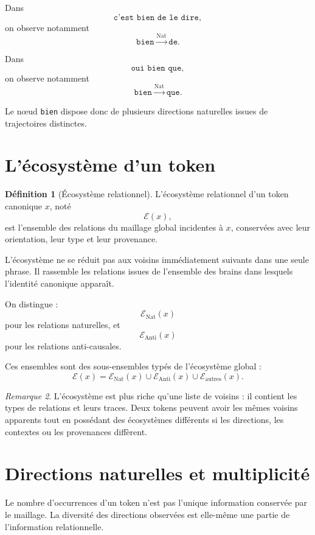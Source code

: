 \documentclass[11pt,a4paper]{report}
\theoremstyle{definition}
\newtheorem{definition}{Définition}[chapter]
\theoremstyle{plain}
\theoremstyle{remark}
\newtheorem{remarque}[definition]{Remarque}
\newcommand{\E}{\mathcal{E}}
\begin{document}
Dans
\[
\texttt{c'est bien de le dire},
\]
on observe notamment
\[
\texttt{bien}
\overset{\mathrm{Nat}}{\longrightarrow}
\texttt{de}.
\]

Dans
\[
\texttt{oui bien que},
\]
on observe notamment
\[
\texttt{bien}
\overset{\mathrm{Nat}}{\longrightarrow}
\texttt{que}.
\]

Le nœud \texttt{bien} dispose donc de plusieurs directions
naturelles issues de trajectoires distinctes.

\section{L'écosystème d'un token}

\begin{definition}[Écosystème relationnel]
L'écosystème relationnel d'un token canonique \(x\), noté
\[
\E(x),
\]
est l'ensemble des relations du maillage global incidentes à
\(x\), conservées avec leur orientation, leur type et leur
provenance.
\end{definition}

L'écosystème ne se réduit pas aux voisins immédiatement
suivants dans une seule phrase. Il rassemble les relations
issues de l'ensemble des brains dans lesquels l'identité
canonique apparaît.

On distingue :
\[
\E_{\mathrm{Nat}}(x)
\]
pour les relations naturelles, et
\[
\E_{\mathrm{Anti}}(x)
\]
pour les relations anti-causales.

Ces ensembles sont des sous-ensembles typés de l'écosystème
global :
\[
\E(x)=
\E_{\mathrm{Nat}}(x)
\cup
\E_{\mathrm{Anti}}(x)
\cup
\E_{\mathrm{autres}}(x).
\]

\begin{remarque}
L'écosystème est plus riche qu'une liste de voisins : il contient
les types de relations et leurs traces. Deux tokens peuvent avoir
les mêmes voisins apparents tout en possédant des écosystèmes
différents si les directions, les contextes ou les provenances
diffèrent.
\end{remarque}

\section{Directions naturelles et multiplicité}

Le nombre d'occurrences d'un token n'est pas l'unique information
conservée par le maillage. La diversité des directions observées
est elle-même une partie de l'information relationnelle.
\end{document}
